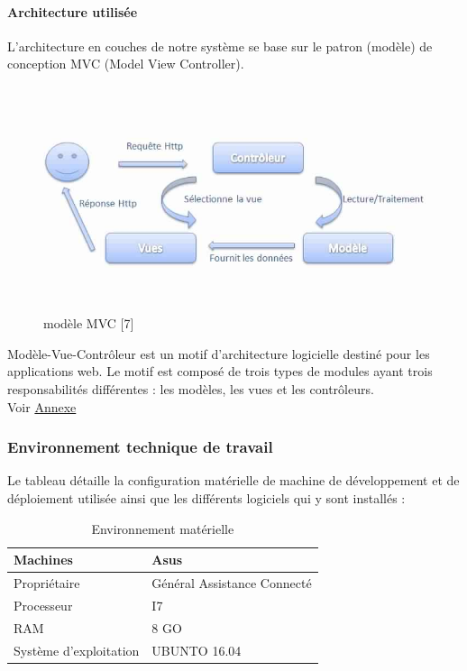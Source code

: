 \documentclass{article}
\begin{document}
\paragraph{Architecture utilisée}
L’architecture en couches de notre système se base sur le patron (modèle) de conception MVC (Model View Controller).
\begin{figure}[H]
\centering
\includegraphics[height=2.6in]{MVC.jpg}
\caption[Figure7 : modèle MVC  ]{modèle MVC [7]}
\label{fig:pic7}
\end{figure}
Modèle-Vue-Contrôleur est un motif d'architecture logicielle destiné pour les applications web. Le motif est composé de trois types de modules ayant trois responsabilités différentes : les modèles, les vues et les contrôleurs.\\
Voir \hyperref[sec:hello4]{Annexe}
\subsubsection{Environnement technique de travail}
Le tableau détaille la configuration matérielle de machine de développement et de déploiement utilisée ainsi que les différents logiciels qui y sont installés :

\begin{table}[H]
\centering
\label{tab:tab4} 
 \begin{tabularx}{\textwidth}{|X|X|}
\hline
 Machines & Asus \\ \hline
Propriétaire& Général Assistance Connecté \\
\hline
Processeur & I7\\
\hline
RAM & 8 GO \\
\hline
Système d’exploitation & UBUNTO 16.04 \\
\hline
\end{tabularx}
\caption[tableau4 : Environnement matérielle]{Environnement matérielle}
\end{table}
\end{document}
